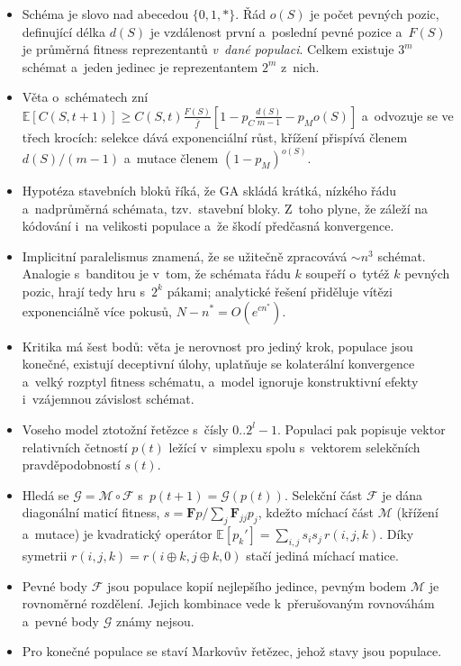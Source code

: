 \documentclass[11pt,a4paper]{article}
\theoremstyle{definition}
\begin{document}
\begin{itemize}
\item Schéma je slovo nad abecedou $\{0,1,*\}$. Řád $o(S)$ je počet pevných pozic,
  definující délka $d(S)$ je vzdálenost první a~poslední pevné pozice a~$F(S)$ je
  průměrná fitness reprezentantů \emph{v~dané populaci}. Celkem existuje $3^m$ schémat
  a~jeden jedinec je reprezentantem $2^m$ z~nich.
\item Věta o~schématech zní
  $\mathbb{E}[C(S,t+1)] \ge C(S,t)\frac{F(S)}{\bar f}
  [1 - p_C \frac{d(S)}{m-1} - p_M o(S)]$ a~odvozuje se ve třech krocích:
  selekce dává exponenciální růst, křížení přispívá členem $d(S)/(m-1)$
  a~mutace členem $(1-p_M)^{o(S)}$.
\item Hypotéza stavebních bloků říká, že GA skládá krátká, nízkého řádu
  a~nadprůměrná schémata, tzv.\ stavební bloky. Z~toho plyne, že záleží na kódování
  i~na velikosti populace a~že škodí předčasná konvergence.
\item Implicitní paralelismus znamená, že se užitečně zpracovává $\sim n^3$ schémat.
  Analogie s~banditou je v~tom, že schémata řádu $k$ soupeří o~tytéž $k$ pevných pozic,
  hrají tedy hru s~$2^k$ pákami; analytické řešení přiděluje vítězi exponenciálně
  více pokusů, $N - n^* = O(e^{c n^*})$.
\item Kritika má šest bodů: věta je nerovnost pro jediný krok, populace jsou konečné,
  existují deceptivní úlohy, uplatňuje se kolaterální konvergence a~velký rozptyl
  fitness schématu, a~model ignoruje konstruktivní efekty i~vzájemnou závislost schémat.
\item Voseho model ztotožní řetězce s~čísly $0..2^l-1$. Populaci pak popisuje
  vektor relativních četností $p(t)$ ležící v~simplexu spolu s~vektorem selekčních
  pravděpodobností $s(t)$.
\item Hledá se $\mathcal{G} = \mathcal{M} \circ \mathcal{F}$ s~$p(t+1)=\mathcal{G}(p(t))$.
  Selekční část $\mathcal{F}$ je dána diagonální maticí fitness,
  $s = \mathbf{F}p / \sum_j \mathbf{F}_{jj}p_j$, kdežto míchací část $\mathcal{M}$
  (křížení a~mutace) je kvadratický operátor
  $\mathbb{E}[p_k'] = \sum_{i,j} s_i s_j\, r(i,j,k)$. Díky symetrii
  $r(i,j,k) = r(i\oplus k, j \oplus k, 0)$ stačí jediná míchací matice.
\item Pevné body $\mathcal{F}$ jsou populace kopií nejlepšího jedince, pevným bodem
  $\mathcal{M}$ je rovnoměrné rozdělení. Jejich kombinace vede k~přerušovaným
  rovnováhám a~pevné body $\mathcal{G}$ známy nejsou.
\item Pro konečné populace se staví Markovův řetězec, jehož stavy jsou populace.

\end{itemize}
\end{document}
